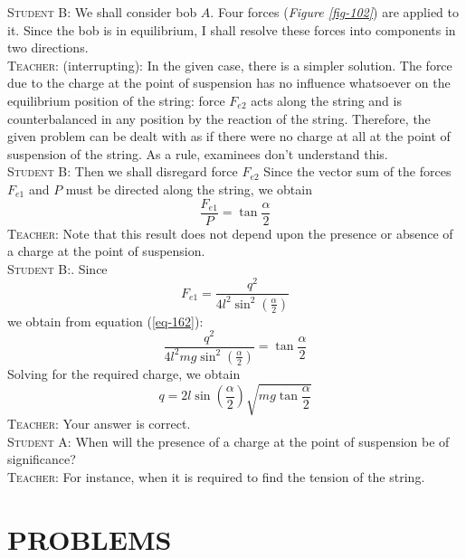 \documentclass[a4paper,sfsidenotes]{tufte-book}
\begin{document}
\textsc{Student B:} We shall consider bob $A$. Four forces (\emph{Figure \ref{fig-102}}) are applied to it. Since the bob is in equilibrium, I shall resolve these forces into components in two directions.
\\
\textsc{Teacher:} (interrupting): In the given case, there is a simpler solution. The force due to the charge at the point of suspension has no influence whatsoever on the equilibrium position of the string: force $F_{e2}$ acts along the string and is counterbalanced in any position by the reaction of the string. Therefore, the given problem can be dealt with as if there were no charge at all at the point of suspension of the string. As a rule, examinees don't understand this.
\\
\textsc{Student B:} Then we shall disregard force $F_{e2}$ Since the vector sum of the forces $F_{e1}$ and $P$ must be directed along the string, we obtain
\begin{equation}%
\frac{F_{e1}}{P} = \tan \frac{\alpha}{2}
\label{eq-162}
\end{equation}
\textsc{Teacher:} Note that this result does not depend upon the presence or absence of a charge at the point of suspension.
\\
\textsc{Student B:}. Since
\begin{equation*}%
F_{e1} = \frac{q^{2}}{4 l^{2} \sin^{2} \left(\frac{\alpha}{2}\right)}
\end{equation*}
we obtain from equation (\ref{eq-162}):
\begin{equation*}%
\frac{q^{2}}{4 l^{2} mg \sin^{2} \left(\frac{\alpha}{2}\right)} = \tan \frac{\alpha}{2}
\end{equation*}
Solving for the required charge, we obtain
\begin{equation}%
q = 2l \sin \left(\frac{\alpha}{2}\right) \sqrt{mg \tan \frac{\alpha}{2}}
\label{eq-163}
\end{equation}
\textsc{Teacher:} Your answer is correct.
\\
\textsc{Student A:} When will the presence of a charge at the point of suspension be of significance?
\\
\textsc{Teacher:} For instance, when it is required to find the tension of the string.


\section{PROBLEMS}
\end{document}
